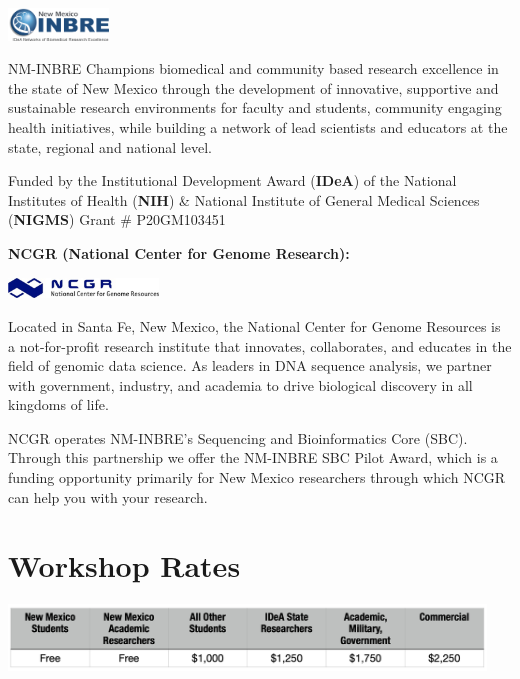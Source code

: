 \documentclass[
]{book}
\begin{document}
\includegraphics[width=0.2\textwidth,height=\textheight]{./Figures/INBRE_Logo_Grad_transparent-2019.png}

NM-INBRE Champions biomedical and community based research excellence in the state of New Mexico through the development of innovative, supportive and sustainable research environments for faculty and students, community engaging health initiatives, while building a network of lead scientists and educators at the state, regional and national level.

Funded by the Institutional Development Award (\textbf{IDeA}) of the National Institutes of Health (\textbf{NIH}) \& National Institute of General Medical Sciences (\textbf{NIGMS}) Grant \# P20GM103451

\textbf{NCGR (National Center for Genome Research):}

\includegraphics[width=0.3\textwidth,height=\textheight]{./Figures/ncgr.png}

Located in Santa Fe, New Mexico, the National Center for Genome Resources is a not-for-profit research institute that innovates, collaborates, and educates in the field of genomic data science. As leaders in DNA sequence analysis, we partner with government, industry, and academia to drive biological discovery in all kingdoms of life.

NCGR operates NM-INBRE's Sequencing and Bioinformatics Core (SBC). Through this partnership we offer the NM-INBRE SBC Pilot Award, which is a funding opportunity primarily for New Mexico researchers through which NCGR can help you with your research.

\hypertarget{workshop-rates}{%
\chapter*{Workshop Rates}\label{workshop-rates}}

\includegraphics[width=0.95\textwidth,height=\textheight]{./Figures/Rates.png}
\end{document}
